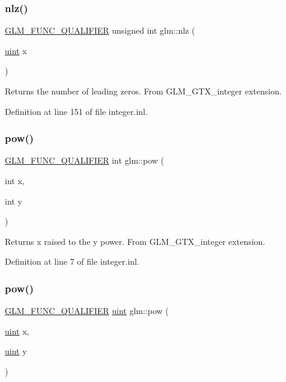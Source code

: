\subsubsection{\texorpdfstring{nlz()}{nlz()}}
{\footnotesize\ttfamily \mbox{\hyperlink{setup_8hpp_a33fdea6f91c5f834105f7415e2a64407}{G\+L\+M\+\_\+\+F\+U\+N\+C\+\_\+\+Q\+U\+A\+L\+I\+F\+I\+ER}} unsigned int glm\+::nlz (\begin{DoxyParamCaption}\item[{\mbox{\hyperlink{group__core__precision_ga4fd29415871152bfb5abd588334147c8}{uint}}}]{x }\end{DoxyParamCaption})}

Returns the number of leading zeros. From G\+L\+M\+\_\+\+G\+T\+X\+\_\+integer extension. 

Definition at line 151 of file integer.\+inl.

\mbox{\label{group__gtx__integer_ga9642514a44a67afa70966d756f040ca9}} 
\subsubsection{\texorpdfstring{pow()}{pow()}\hspace{0.1cm}{\footnotesize\ttfamily [1/2]}}
{\footnotesize\ttfamily \mbox{\hyperlink{setup_8hpp_a33fdea6f91c5f834105f7415e2a64407}{G\+L\+M\+\_\+\+F\+U\+N\+C\+\_\+\+Q\+U\+A\+L\+I\+F\+I\+ER}} int glm\+::pow (\begin{DoxyParamCaption}\item[{int}]{x,  }\item[{int}]{y }\end{DoxyParamCaption})}

Returns x raised to the y power. From G\+L\+M\+\_\+\+G\+T\+X\+\_\+integer extension. 

Definition at line 7 of file integer.\+inl.

\mbox{\label{group__gtx__integer_gaa8229e850c3cc4ad83492fe390ada044}} 
\subsubsection{\texorpdfstring{pow()}{pow()}\hspace{0.1cm}{\footnotesize\ttfamily [2/2]}}
{\footnotesize\ttfamily \mbox{\hyperlink{setup_8hpp_a33fdea6f91c5f834105f7415e2a64407}{G\+L\+M\+\_\+\+F\+U\+N\+C\+\_\+\+Q\+U\+A\+L\+I\+F\+I\+ER}} \mbox{\hyperlink{group__core__precision_ga4fd29415871152bfb5abd588334147c8}{uint}} glm\+::pow (\begin{DoxyParamCaption}\item[{\mbox{\hyperlink{group__core__precision_ga4fd29415871152bfb5abd588334147c8}{uint}}}]{x,  }\item[{\mbox{\hyperlink{group__core__precision_ga4fd29415871152bfb5abd588334147c8}{uint}}}]{y }\end{DoxyParamCaption})}

